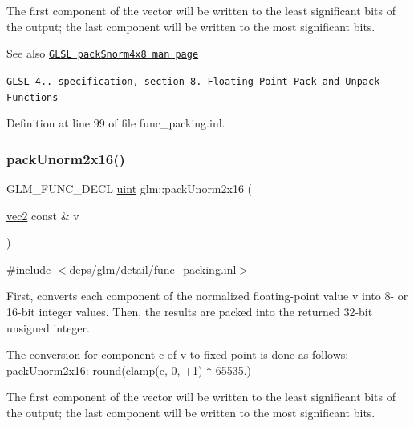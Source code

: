 The first component of the vector will be written to the least significant bits of the output; the last component will be written to the most significant bits.

\begin{DoxySeeAlso}{See also}
\href{http://www.opengl.org/sdk/docs/manglsl/xhtml/packSnorm4x8.xml}{\tt G\+L\+SL pack\+Snorm4x8 man page} 

\href{http://www.opengl.org/registry/doc/GLSLangSpec.4.20.8.pdf}{\tt G\+L\+SL 4.. specification, section 8. Floating-\/\+Point Pack and Unpack Functions} 
\end{DoxySeeAlso}


Definition at line 99 of file func\+\_\+packing.\+inl.

\mbox{\label{group__core__func__packing_ga0e2d107039fe608a209497af867b85fb}} 
\subsubsection{\texorpdfstring{pack\+Unorm2x16()}{packUnorm2x16()}}
{\footnotesize\ttfamily G\+L\+M\+\_\+\+F\+U\+N\+C\+\_\+\+D\+E\+CL \hyperlink{group__core__precision_ga4fd29415871152bfb5abd588334147c8}{uint} glm\+::pack\+Unorm2x16 (\begin{DoxyParamCaption}\item[{\hyperlink{group__core__types_gaa1618f51db67eaa145db101d8c8431d8}{vec2} const \&}]{v }\end{DoxyParamCaption})}



{\ttfamily \#include $<$\hyperlink{func__packing_8inl}{deps/glm/detail/func\+\_\+packing.\+inl}$>$}

First, converts each component of the normalized floating-\/point value v into 8-\/ or 16-\/bit integer values. Then, the results are packed into the returned 32-\/bit unsigned integer.

The conversion for component c of v to fixed point is done as follows\+: pack\+Unorm2x16\+: round(clamp(c, 0, +1) $\ast$ 65535.)

The first component of the vector will be written to the least significant bits of the output; the last component will be written to the most significant bits.

